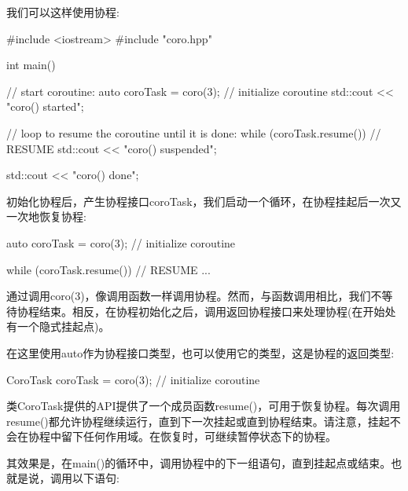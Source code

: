 
我们可以这样使用协程:


\begin{cpp}
#include <iostream>
#include "coro.hpp"

int main()
{
	// start coroutine:
	auto coroTask = coro(3); // initialize coroutine
	std::cout << "coro() started\n";
	
	// loop to resume the coroutine until it is done:
	while (coroTask.resume()) { // RESUME
		std::cout << "coro() suspended\n";
	}
	
	std::cout << "coro() done\n";
}
\end{cpp}

初始化协程后，产生协程接口coroTask，我们启动一个循环，在协程挂起后一次又一次地恢复协程:

\begin{cpp}
auto coroTask = coro(3); // initialize coroutine

while (coroTask.resume()) { // RESUME
	...
}
\end{cpp}

通过调用coro(3)，像调用函数一样调用协程。然而，与函数调用相比，我们不等待协程结束。相反，在协程初始化之后，调用返回协程接口来处理协程(在开始处有一个隐式挂起点)。

在这里使用auto作为协程接口类型，也可以使用它的类型，这是协程的返回类型:

\begin{cpp}
CoroTask coroTask = coro(3); // initialize coroutine
\end{cpp}

类CoroTask提供的API提供了一个成员函数resume()，可用于恢复协程。每次调用resume()都允许协程继续运行，直到下一次挂起或直到协程结束。请注意，挂起不会在协程中留下任何作用域。在恢复时，可继续暂停状态下的协程。

其效果是，在main()的循环中，调用协程中的下一组语句，直到挂起点或结束。也就是说，调用以下语句:

